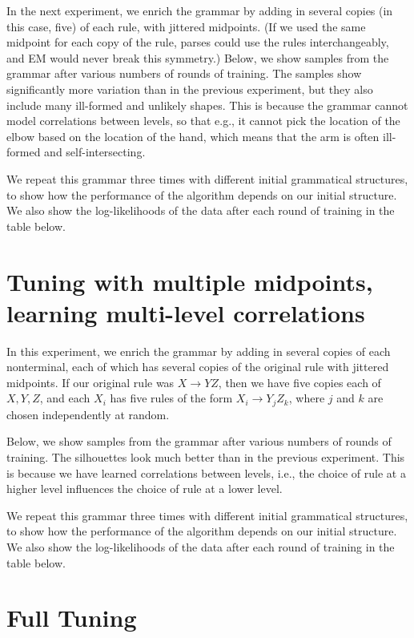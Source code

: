 In the next experiment, we enrich the grammar by adding in several
copies (in this case, five) of each rule, with jittered midpoints. (If
we used the same midpoint for each copy of the rule, parses could use
the rules interchangeably, and EM would never break this symmetry.)
Below, we show samples from the grammar after various numbers of
rounds of training. The samples show significantly more variation than
in the previous experiment, but they also include many ill-formed and
unlikely shapes. This is because the grammar cannot model correlations
between levels, so that e.g., it cannot pick the location of the elbow
based on the location of the hand, which means that the arm is often
ill-formed and self-intersecting.

We repeat this grammar three times with different initial grammatical
structures, to show how the performance of the algorithm depends on
our initial structure. We also show the log-likelihoods of the data
after each round of training in the table below.



\section{Tuning with multiple midpoints, learning multi-level correlations}

In this experiment, we enrich the grammar by adding in several copies
of each nonterminal, each of which has several copies of the original
rule with jittered midpoints. If our original rule was $X\to YZ$, then
we have five copies each of $X,Y,Z$, and each $X_i$ has five rules of
the form $X_i \to Y_j Z_k$, where $j$ and $k$ are chosen independently
at random.

Below, we show samples from the grammar after various numbers of
rounds of training. The silhouettes look much better than in the
previous experiment. This is because we have learned correlations
between levels, i.e., the choice of rule at a higher level influences
the choice of rule at a lower level.

We repeat this grammar three times with different initial grammatical
structures, to show how the performance of the algorithm depends on
our initial structure. We also show the log-likelihoods of the data
after each round of training in the table below.



\section{Full Tuning}


